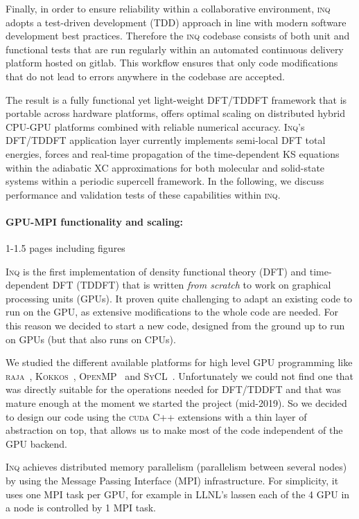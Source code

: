 Finally, in order to ensure reliability within a collaborative environment, \textsc{inq} adopts a test-driven development (TDD) approach in line with modern software development best practices. 
Therefore the \textsc{inq} codebase consists of both unit and functional tests that are run regularly within an automated continuous delivery platform hosted on gitlab. This workflow ensures that only code modifications that do not lead to errors anywhere in the codebase are accepted.

The result is a fully functional yet light-weight DFT/TDDFT framework that is portable across hardware platforms, offers optimal scaling on distributed hybrid CPU-GPU platforms combined with reliable numerical accuracy. 
\textsc{Inq}'s DFT/TDDFT application layer currently implements semi-local DFT total energies, forces and real-time propagation of the time-dependent KS equations within the adiabatic XC approximations for both molecular and solid-state systems within a periodic supercell framework. 
In the following, we discuss performance and validation tests of these capabilities within \textsc{inq}. 

\paragraph{GPU-MPI functionality and scaling:}
1-1.5 pages including figures

\textsc{Inq} is the first implementation of density functional theory (DFT) and time-dependent DFT (TDDFT) that is written \emph{from scratch} to work on graphical processing units (GPUs).
It proven quite challenging to adapt an existing code to run on the GPU, as extensive modifications to the whole code are needed.
For this reason we decided to start a new code, designed from the ground up to run on GPUs (but that also runs on CPUs). 

We studied the different available platforms for high level GPU programming like \textsc{raja}~\cite{Beckingsale2019}, \textsc{Kokkos}~\cite{CarterEdwards2014}, \textsc{OpenMP}~\cite{Lee2010} and \textsc{SyCL}~\cite{Alpay2020}.
Unfortunately we could not find one that was directly suitable for the operations needed for DFT/TDDFT and that was mature enough at the moment we started the project (mid-2019).
So we decided to design our code using the \textsc{cuda} C++ extensions with a thin layer of abstraction on top, that allows us to make most of the code independent of the GPU backend.

\textsc{Inq} achieves distributed memory parallelism (parallelism between several nodes) by using the Message Passing Interface (\textsc{MPI}) infrastructure.
For simplicity, it uses one MPI task per GPU, for example in LLNL's lassen each of the 4 GPU in a node is controlled by 1 MPI task.

